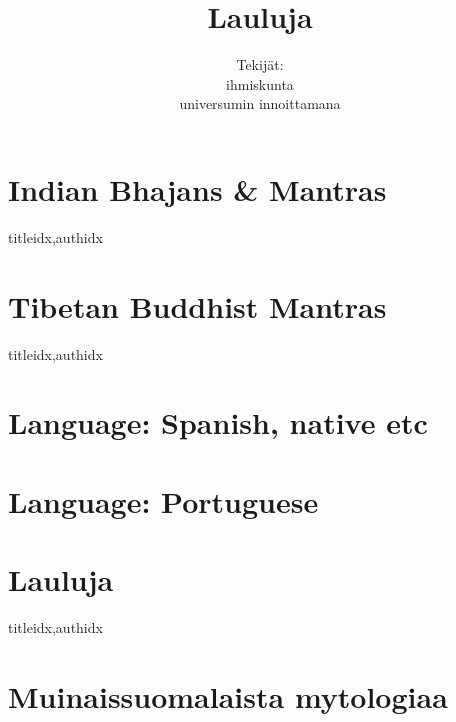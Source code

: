 \documentclass[twoside,10pt,finnish]{book}
\title{Lauluja}
\author{Tekijät: \\
        ihmiskunta \\
        universumin innoittamana}
\begin{document}
  \maketitle
  \tableofcontents %

  \clearpage\scleardpage
    \section{Indian Bhajans \& Mantras} 
      \begin{songs}{titleidx,authidx}
        \setcounter{songnum}{100}
        
      \end{songs}
     \scleardpage
    \section{Tibetan Buddhist Mantras}
      \begin{songs}{titleidx,authidx}
        \setcounter{songnum}{170}
        
      \end{songs}  
  
  \clearpage\scleardpage
    \section{Language: Spanish, native etc}
    \section{Language: Portuguese}
  
  \clearpage\scleardpage
  
  \clearpage\scleardpage
    \section{Lauluja}
      \begin{songs}{titleidx,authidx}
        \setcounter{songnum}{400}
        
      \end{songs}

    \clearpage\scleardpage
    \section{Muinaissuomalaista mytologiaa}
      
\end{document}
